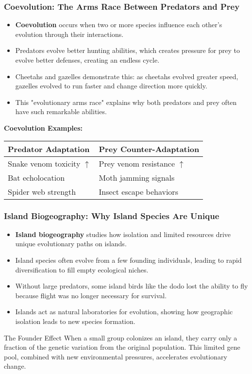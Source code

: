 \documentclass{beamer}
\begin{document}
	\begin{frame}
		\frametitle{Coevolution: The Arms Race Between Predators and Prey}
		\begin{itemize}
			\item \textbf{Coevolution} occurs when two or more species influence each other's evolution through their interactions.
			\item Predators evolve better hunting abilities, which creates pressure for prey to evolve better defenses, creating an endless cycle.
			\item Cheetahs and gazelles demonstrate this: as cheetahs evolved greater speed, gazelles evolved to run faster and change direction more quickly.
			\item This "evolutionary arms race" explains why both predators and prey often have such remarkable abilities.
		\end{itemize}
		\begin{example}
			\textbf{Coevolution Examples:}
			\begin{tabular}{ll}
				Predator Adaptation & Prey Counter-Adaptation \\
				\hline
				Snake venom toxicity $\uparrow$ & Prey venom resistance $\uparrow$ \\
				Bat echolocation & Moth jamming signals \\
				Spider web strength & Insect escape behaviors \\
			\end{tabular}
		\end{example}
	\end{frame}
	
	\begin{frame}
		\frametitle{Island Biogeography: Why Island Species Are Unique}
		\begin{itemize}
			\item \textbf{Island biogeography} studies how isolation and limited resources drive unique evolutionary paths on islands.
			\item Island species often evolve from a few founding individuals, leading to rapid diversification to fill empty ecological niches.
			\item Without large predators, some island birds like the dodo lost the ability to fly because flight was no longer necessary for survival.
			\item Islands act as natural laboratories for evolution, showing how geographic isolation leads to new species formation.
		\end{itemize}
		\begin{block}{The Founder Effect}
			When a small group colonizes an island, they carry only a fraction of the genetic variation from the original population. This limited gene pool, combined with new environmental pressures, accelerates evolutionary change.
		\end{block}
	\end{frame}
	
\end{document}
